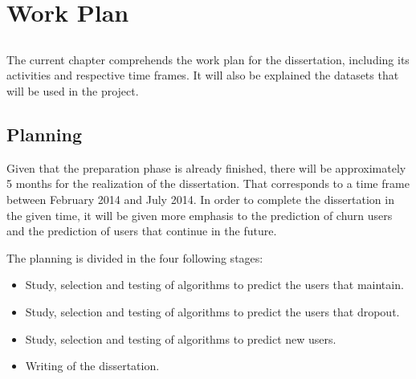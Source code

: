 \chapter{Work Plan}\label{chap:chap3}

\section*{}

The current chapter comprehends the work plan for the dissertation, including its activities and respective time frames.
It will also be explained the datasets that will be used in the project.

\section{Planning}

Given that the preparation phase is already finished, there will be approximately 5 months for the realization of the dissertation.
That corresponds to a time frame between February 2014 and July 2014. In order to complete the dissertation in the given time, it will be given more emphasis to the
prediction of churn users and the prediction of users that continue in the future.

The planning is divided in the four following stages:
\begin{itemize}
  \item Study, selection and testing of algorithms to predict the users that maintain.
  \item Study, selection and testing of algorithms to predict the users that dropout.
  \item Study, selection and testing of algorithms to predict new users.
  \item Writing of the dissertation.
\end{itemize}



